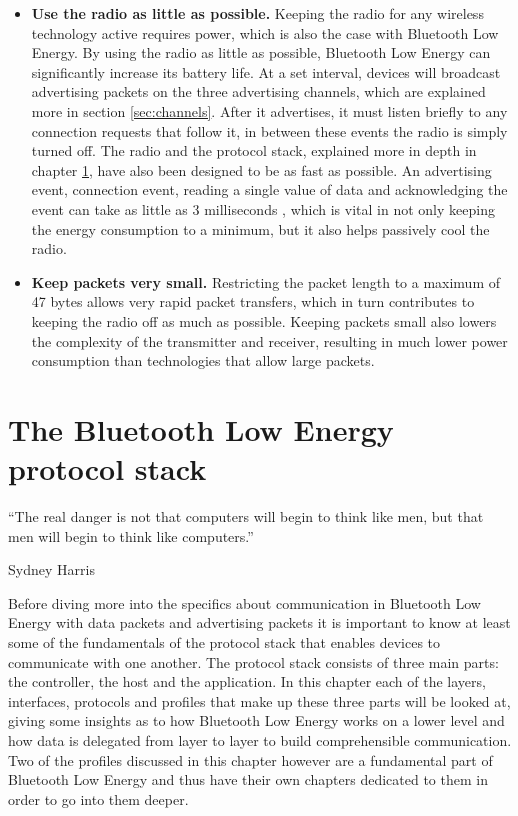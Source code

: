 \documentclass[pdftex,a4paper,12pt,twoside]{report}
\begin{document}
\begin{itemize}
\item{\textbf{Use the radio as little as possible.} Keeping the radio for any wireless technology active requires power, which is also the case with Bluetooth Low Energy. By using the radio as little as possible, Bluetooth Low Energy can significantly increase its battery life. At a set interval, devices will broadcast advertising packets on the three advertising channels, which are explained more in section \ref{sec:channels}. After it advertises, it must listen briefly to any connection requests that follow it, in between these events the radio is simply turned off. The radio and the protocol stack, explained more in depth in chapter \ref{ch:protocolstack}, have also been designed to be as fast as possible. An advertising event, connection event, reading a single value of data and acknowledging the event can take as little as 3 milliseconds \citep{heydon2012bluetooth}, which is vital in not only keeping the energy consumption to a minimum, but it also helps passively cool the radio.}

\item{\textbf{Keep packets very small.} Restricting the packet length to a maximum of 47 bytes allows very rapid packet transfers, which in turn contributes to keeping the radio off as much as possible. Keeping packets small also lowers the complexity of the transmitter and receiver, resulting in much lower power consumption than technologies that allow large packets.}
\end{itemize}

\chapter{The Bluetooth Low Energy protocol stack}
\label{ch:protocolstack}
\epigraph{``The real danger is not that computers will begin to think like men, but that men will begin to think like computers.''}{Sydney Harris}
Before diving more into the specifics about communication in Bluetooth Low Energy with data packets and advertising packets it is important to know at least some of the fundamentals of the protocol stack that enables devices to communicate with one another. The protocol stack consists of three main parts: the controller, the host and the application. In this chapter each of the layers, interfaces, protocols and profiles that make up these three parts will be looked at, giving some insights as to how Bluetooth Low Energy works on a lower level and how data is delegated from layer to layer to build comprehensible communication. Two of the profiles discussed in this chapter however are a fundamental part of Bluetooth Low Energy and thus have their own chapters dedicated to them in order to go into them deeper.
\end{document}
